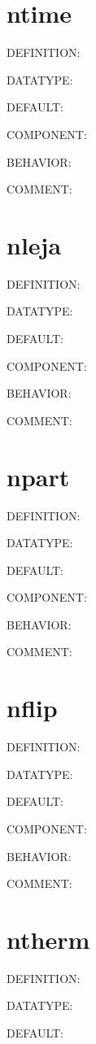 \section{ntime}
{\color{red}DEFINITION:}

{\color{green}DATATYPE:}

{\color{blue}DEFAULT:}

{\color{brown}COMPONENT:}

{\color{purple}BEHAVIOR:}

{\color{olive}COMMENT:}

\section{nleja}
{\color{red}DEFINITION:}

{\color{green}DATATYPE:}

{\color{blue}DEFAULT:}

{\color{brown}COMPONENT:}

{\color{purple}BEHAVIOR:}

{\color{olive}COMMENT:}

\section{npart}
{\color{red}DEFINITION:}

{\color{green}DATATYPE:}

{\color{blue}DEFAULT:}

{\color{brown}COMPONENT:}

{\color{purple}BEHAVIOR:}

{\color{olive}COMMENT:}

\section{nflip}
{\color{red}DEFINITION:}

{\color{green}DATATYPE:}

{\color{blue}DEFAULT:}

{\color{brown}COMPONENT:}

{\color{purple}BEHAVIOR:}

{\color{olive}COMMENT:}

\section{ntherm}
{\color{red}DEFINITION:}

{\color{green}DATATYPE:}

{\color{blue}DEFAULT:}

